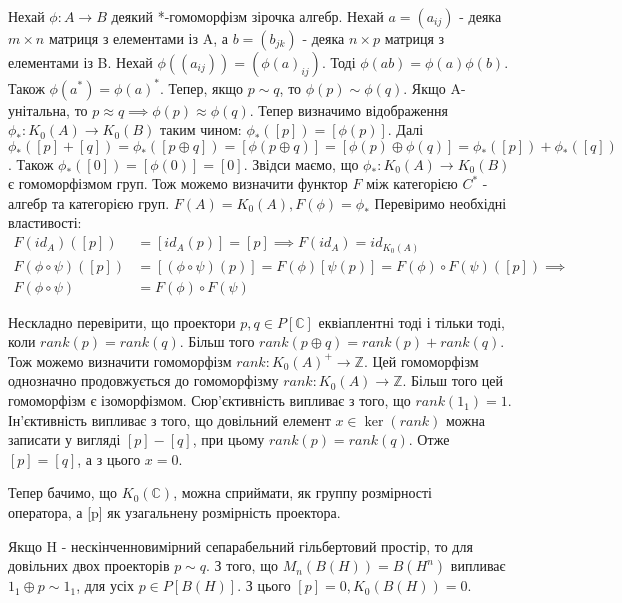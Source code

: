 Нехай $\phi : A \rightarrow B$ деякий *-гомоморфізм зірочка алгебр.
Нехай $a = (a_{ij})$ - деяка $m \times n$ матриця з елементами із A, а $b = (b_{jk})$ - деяка $n \times p$ матриця з елементами із B.
Нехай $\phi((a_{ij})) = (\phi(a)_{ij})$. Тоді $\phi(a b) = \phi(a) \phi(b)$.
Також $\phi(a^*) = \phi(a)^*$.
Тепер, якщо $p \sim q$, то $\phi(p) \sim \phi(q)$.
Якщо A-унітальна, то $p \approx q \implies \phi(p) \approx \phi(q)$.
Тепер визначимо відображення $\phi_* : K_0(A) \rightarrow K_0(B)$ таким чином: $\phi_*([p]) = [\phi(p)]$.
Далі $\phi_*([p]+[q]) = \phi_*([p \oplus q]) = [\phi(p \oplus q)] = [\phi(p) \oplus \phi(q)] = \phi_*([p]) + \phi_*([q])$.
Також $\phi_*([0]) = [\phi(0)] = [0]$.
Звідси маємо, що $\phi_*: K_0(A) \rightarrow K_0(B)$ є гомоморфізмом груп.
Тож можемо визначити функтор $F$ між категорією $C^*$ - алгебр та категорією груп.
$F(A) = K_0(A), F(\phi) = \phi_*$
Перевіримо необхідні властивості:
\begin{align*}
    F(id_A)([p]) &= [id_A(p)] = [p] \implies F(id_A) = id_{K_0(A)} \\
    F(\phi \circ \psi)([p]) &= [(\phi \circ \psi)(p)] = F(\phi)[\psi(p)] = F(\phi) \circ F(\psi)([p]) \implies \\
    F(\phi \circ \psi) &= F(\phi) \circ F(\psi)
\end{align*}

\begin{example}
    Нескладно перевірити, що проектори $p,q \in P[\mathbb{C}]$ еквіаплентні тоді і тільки тоді, коли
    $rank(p) = rank(q)$.
    Більш того $rank(p \oplus q) = rank(p) + rank(q)$.
    Тож можемо визначити гомоморфізм $rank: K_0(A)^+  \rightarrow \mathbb{Z}$.
    Цей гомоморфізм однозначно продовжується до гомоморфізму $rank: K_0(A) \rightarrow \mathbb{Z}$.
    Більш того цей гомоморфізм є ізоморфізмом.
    Сюр'єктивність випливає з того, що $rank(1_1) = 1$.
    Ін'єктивність випливає з того, що довільний елемент $x \in \ker(rank)$ можна записати
    у вигляді $[p]-[q]$, при цьому $rank(p) = rank(q)$.
    Отже $[p]=[q]$, а з цього $x = 0$.

    Тепер бачимо, що $K_0(\mathbb{C})$, можна сприймати, як группу розмірності \\
    оператора, а [p] як узагальнену розмірність проектора.
\end{example}
\begin{example}
    Якщо H - нескінченновимірний сепарабельний гільбертовий простір, то для довільних двох
    проекторів $p \sim q$.
    З того, що $M_n(B(H)) = B(H^n)$ випливає $1_1 \oplus p \sim 1_1$, для усіх $p \in P[B(H)]$.
    З цього $[p] = 0, K_0(B(H)) = 0$.
\end{example}

